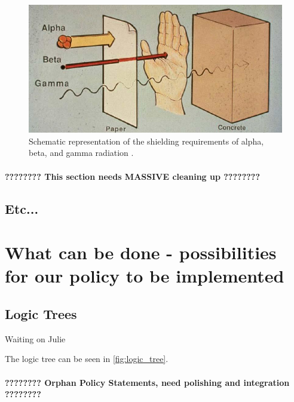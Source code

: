 \documentclass{report}
\begin{document}
\begin{figure}[h]
 \centering
 \includegraphics[trim = 0cm 0cm 0cm 0cm, clip,scale=0.5]{./figures/shielding_reqs.jpg}
   \caption{Schematic representation of the shielding requirements of alpha, beta, and gamma radiation \cite{Hallenbeck1994}. }
     \label{fig:shielding_reqs}
\end{figure}

\subsubsection{????????  This section needs MASSIVE cleaning up ????????}




\section{Etc...}




\chapter{What can be done - possibilities for our policy to be implemented}

\section{Logic Trees}

Waiting on Julie

The logic tree can be seen in \autoref{fig:logic_tree}.




\subsubsection{????????  Orphan Policy Statements, need polishing and integration ????????}
\end{document}

